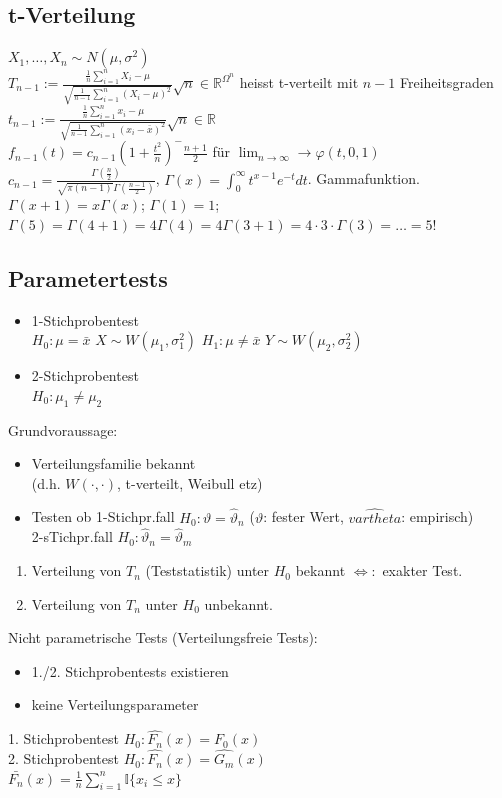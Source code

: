\documentclass[a4paper,10pt]{article}
\newcommand{\RN}{\mathbb{R}} %
\newcommand{\Lra}{\Leftrightarrow}
\newcommand{\Sumone}[2]{\sum_{#2=1}^{#1}} %
\newcommand{\Oneover}[1]{\frac{1}{#1}} %
\begin{document}
\subsection{t-Verteilung}
$X_1,\dots,X_n\sim N(\mu,\sigma^2)$\\
$T_{n-1}:=\frac{\Oneover{n}\Sumone{n}{i}X_i-\mu}{\sqrt{\Oneover{n-1}\Sumone{n}{i}(X_i-\mu)^2}}\sqrt{n} \in\RN^{\Omega^n}$ heisst t-verteilt mit $n-1$ Freiheitsgraden\\
$t_{n-1}:=\frac{\Oneover{n}\Sumone{n}{i}x_i-\mu}{\sqrt{\Oneover{n-1}\Sumone{n}{i}(x_i-\bar{x})^2}}\sqrt{n}\in\RN$\\
$f_{n-1}(t)=c_{n-1}(1+\frac{t^2}{n})^-{\frac{n+1}{2}}$ für $\lim_{n\to\infty}\to\varphi(t,0,1)$\\
$c_{n-1}=\frac{\Gamma(\frac{n}{2})}{\sqrt{\pi(n-1)}\Gamma(\frac{n-1}{2})}$, $\Gamma(x)=\int_0^\infty t^{x-1}e^{-t}dt$. Gammafunktion.\\
$\Gamma(x+1)=x\Gamma(x)$; $\Gamma(1)=1$; $\Gamma(5)=\Gamma(4+1)=4\Gamma(4)=4\Gamma(3+1)=4\cdot3\cdot\Gamma(3)=\dots=5!$\\
\subsection{Parametertests}
\begin{itemize}
 \item 1-Stichprobentest\\
$H_0:\mu=\bar{x}$ $X\sim W(\mu_1,\sigma_1^2)$
$H_1:\mu\neq\bar{x}$ $Y\sim W(\mu_2, \sigma_2^2)$
 \item 2-Stichprobentest\\
$H_0:\mu_1\neq\mu_2$
\end{itemize}
Grundvoraussage:
\begin{itemize}
 \item Verteilungsfamilie bekannt\\
 (d.h. $W(\cdot,\cdot)$, t-verteilt, Weibull etz)
 \item Testen ob 
1-Stichpr.fall $H_0:\vartheta=\hat{\vartheta}_n$ ($\vartheta$: fester Wert, $\hat{vartheta}$: empirisch)\\
2-sTichpr.fall $H_0:\hat{\vartheta}_n=\hat{\vartheta}_m$
\end{itemize}
\begin{enumerate}
 \item Verteilung von $T_n$ (Teststatistik) unter $H_0$ bekannt $\Lra:$ exakter Test.
 \item Verteilung von $T_n$ unter $H_0$ unbekannt.
\end{enumerate}
Nicht parametrische Tests (Verteilungsfreie Tests):
\begin{itemize}
 \item 1./2. Stichprobentests existieren
 \item keine Verteilungsparameter
\end{itemize}
1. Stichprobentest $H_0:\hat{F_n}(x)=F_0(x)$\\
2. Stichprobentest $H_0:\hat{F_n}(x)=\hat{G_m}(x)$\\
$\bar{F_n}(x)=\Oneover{n}\Sumone{n}{i}\mathbb{I}\{x_i\leq x\}$
\end{document}
